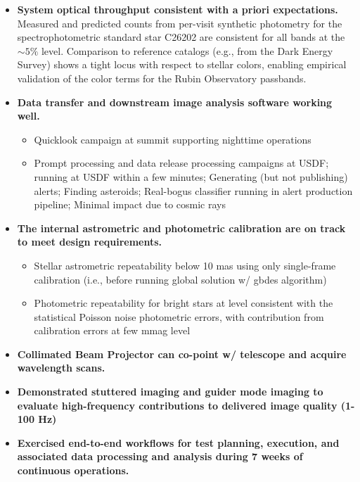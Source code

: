 \begin{itemize}
    \item \textbf{System optical throughput consistent with a priori expectations.} Measured and predicted counts from per-visit synthetic photometry for the spectrophotometric standard star C26202 are consistent for all bands at the $\sim5\%$ level.
    Comparison to reference catalogs (e.g., from the Dark Energy Survey) shows a tight locus with respect to stellar colors, enabling empirical validation of the color terms for the Rubin Observatory passbands.
    \item \textbf{Data transfer and downstream image analysis software working well.}
    \begin{itemize}
        \item Quicklook campaign at summit supporting nighttime operations
        \item Prompt processing and data release processing campaigns at USDF; running at USDF within a few minutes; Generating (but not publishing) alerts; Finding asteroids; Real-bogus classifier running in alert production pipeline; Minimal impact due to cosmic rays
    \end{itemize}
    \item \textbf{The internal astrometric and photometric calibration are on track to meet design requirements.}
    \begin{itemize}
        \item Stellar astrometric repeatability below 10 mas using only single-frame calibration (i.e., before running global solution w/ gbdes algorithm)
        \item Photometric repeatability for bright stars at level consistent with the statistical Poisson noise photometric errors, with contribution from calibration errors at few mmag level
    \end{itemize}
    \item \textbf{Collimated Beam Projector can co-point w/ telescope and acquire wavelength scans.}
    \item \textbf{Demonstrated stuttered imaging and guider mode imaging to evaluate high-frequency contributions to delivered image quality (1-100 Hz)}
    \item \textbf{Exercised end-to-end workflows for test planning, execution, and associated data processing and analysis during 7 weeks of continuous operations.}
    \begin{itemize}

\end{itemize}
\end{itemize}
